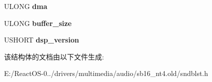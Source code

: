 \begin{DoxyCompactItemize}
U\+L\+O\+NG {\bfseries dma}
\item 
\mbox{\label{struct___s_o_u_n_d___b_l_a_s_t_e_r___p_a_r_a_m_e_t_e_r_s_ae9a6652b1375c90025ffe723a0c62691}} 
U\+L\+O\+NG {\bfseries buffer\+\_\+size}
\item 
\mbox{\label{struct___s_o_u_n_d___b_l_a_s_t_e_r___p_a_r_a_m_e_t_e_r_s_ac70cfd0c5faf050b749cc5dcaa159c28}} 
U\+S\+H\+O\+RT {\bfseries dsp\+\_\+version}
\end{DoxyCompactItemize}


该结构体的文档由以下文件生成\+:\begin{DoxyCompactItemize}
\item 
E\+:/\+React\+O\+S-\/0../drivers/multimedia/audio/sb16\+\_\+nt4.\+old/sndblst.\+h\end{DoxyCompactItemize}
